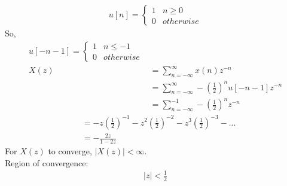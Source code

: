\documentclass[journal,12pt,twocolumn]{IEEEtran}
\providecommand{\sbrak}[1]{\ensuremath{\left[#1\right]}}
\providecommand{\abs}[1]{\left\vert#1\right\vert}
\numberwithin{equation}{section}
\begin{document}
\begin{enumerate}[label=\arabic*]
\begin{align}
u \sbrak{n}=
\begin{cases}
1 & n \geq 0\\
0 & otherwise
\end{cases}
\end{align}
So,
\begin{align}
u \sbrak{-n-1}=
\begin{cases}
1 & n \leq -1\\
0 & otherwise
\end{cases}\\
X(z) &= \sum_{n=-\infty}^{\infty}x(n)z^{-n}\\
&=\sum_{n=-\infty}^{\infty} -\left(\frac{1}{2}\right)^n u \sbrak{-n-1}z^{-n}\\
&= \sum_{n=-\infty}^{-1} -\left(\frac{1}{2}\right)^n z^{-n}
\end{align}
\begin{align}
&= -z\left(\frac{1}{2}\right)^{-1}-z^2\left(\frac{1}{2}\right)^{-2}-z^3\left(\frac{1}{2}\right)^{-3} -...\\
&= -\frac{2z}{1 - 2z}
\end{align}
For $X(z)$ to converge, $\abs{X(z)}<\infty$.\\
Region of convergence:
\begin{align}
\abs{z} < \frac{1}{2}
\end{align}
\end{enumerate} 
 
\end{document}
